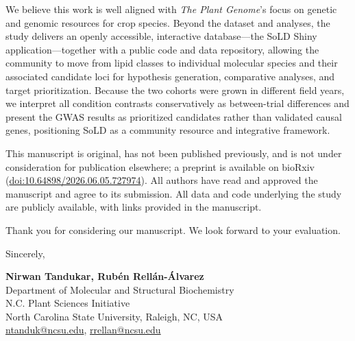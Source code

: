 \documentclass[12pt]{article}
\begin{document}
We believe this work is well aligned with \textit{The Plant Genome}'s focus on genetic and genomic resources for crop species. Beyond the dataset and analyses, the study delivers an openly accessible, interactive database---the SoLD Shiny application---together with a public code and data repository, allowing the community to move from lipid classes to individual molecular species and their associated candidate loci for hypothesis generation, comparative analyses, and target prioritization. Because the two cohorts were grown in different field years, we interpret all condition contrasts conservatively as between-trial differences and present the GWAS results as prioritized candidates rather than validated causal genes, positioning SoLD as a community resource and integrative framework.
 
This manuscript is original, has not been published previously, and is not under consideration for publication elsewhere; a preprint is available on bioRxiv (\href{https://doi.org/10.64898/2026.06.05.727974}{doi:10.64898/2026.06.05.727974}). All authors have read and approved the manuscript and agree to its submission. All data and code underlying the study are publicly available, with links provided in the manuscript.
 
Thank you for considering our manuscript. We look forward to your evaluation.
 
\vspace{1em}
Sincerely,

\textbf{Nirwan Tandukar, Rub\'en Rell\'an-\'Alvarez} \\
Department of Molecular and Structural Biochemistry \\
N.C. Plant Sciences Initiative \\
North Carolina State University, Raleigh, NC, USA \\
\href{mailto:ntanduk@ncsu.edu}{ntanduk@ncsu.edu}, \href{mailto:rrellan@ncsu.edu}{rrellan@ncsu.edu}
\end{document}
